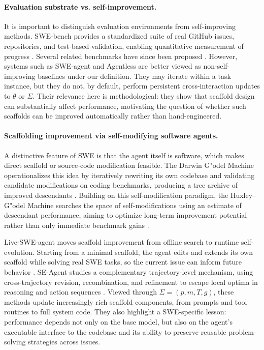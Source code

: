 \documentclass{article}
\begin{document}
\paragraph{Evaluation substrate vs. self-improvement.}
It is important to distinguish evaluation environments from self-improving methods. SWE-bench provides a standardized suite of real GitHub issues, repositories, and test-based validation, enabling quantitative measurement of progress \citep{jimenez2024swebenchlanguagemodelsresolve}. Several related benchmarks have since been proposed \citep{deng2025swebenchproaiagents, aleithan2024swebenchenhancedcodingbenchmark, yang2025swebench}. However, systems such as SWE-agent \citep{yang2024sweagentagentcomputerinterfacesenable} and Agentless \citep{xia2024agentlessdemystifyingllmbasedsoftware} are better viewed as non-self-improving baselines under our definition. They may iterate within a task instance, but they do not, by default, perform persistent cross-interaction updates to $\theta$ or $\Sigma$. Their relevance here is methodological: they show that scaffold design can substantially affect performance, motivating the question of whether such scaffolds can be improved automatically rather than hand-engineered.

\paragraph{Scaffolding improvement via self-modifying software agents.}
A distinctive feature of SWE is that the agent itself is software, which makes direct scaffold or source-code modification feasible. The Darwin G"odel Machine operationalizes this idea by iteratively rewriting its own codebase and validating candidate modifications on coding benchmarks, producing a tree archive of improved descendants \citep{zhang2025darwingodelmachineopenended}. Building on this self-modification paradigm, the Huxley--G"odel Machine searches the space of self-modifications using an estimate of descendant performance, aiming to optimize long-term improvement potential rather than only immediate benchmark gains \citep{wang2025huxleygodelmachinehumanlevelcoding}.

Live-SWE-agent moves scaffold improvement from offline search to runtime self-evolution. Starting from a minimal scaffold, the agent edits and extends its own scaffold while solving real SWE tasks, so the current issue can inform future behavior \citep{xia2025livesweagentsoftwareengineeringagents}. SE-Agent studies a complementary trajectory-level mechanism, using cross-trajectory revision, recombination, and refinement to escape local optima in reasoning and action sequences \citep{lin2025seagentselfevolutiontrajectoryoptimization}. Viewed through $\Sigma=(p,m,T,g)$, these methods update increasingly rich scaffold components, from prompts and tool routines to full system code. They also highlight a SWE-specific lesson: performance depends not only on the base model, but also on the agent's executable interface to the codebase and its ability to preserve reusable problem-solving strategies across issues.
\end{document}
